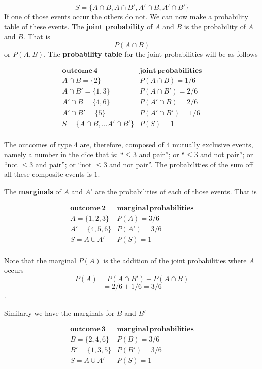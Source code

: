 \documentclass[
]{book}
\begin{document}
\[S=\{A\cap B, A \cap B', A'\cap B, A'\cap B'\}\]
If one of those events occur the others do not. We can now make a probability table of these events. The \textbf{joint probability} of \(A\) and \(B\) is the probability of \(A\) and \(B\). That is \[P( A \cap B)\] or \(P(A,B)\). The \textbf{probability table} for the joint probabilities will be as follows

\[
\begin{array}{ll}
\mathbf{outcome\, 4}  & \mathbf{joint\,probabilities} \\
 A\cap B=\{2\}    & P(A\cap B)=1/6 \\
 A\cap B'=\{1,3\} & P(A\cap B')=2/6 \\
 A'\cap B=\{4,6\} & P(A'\cap B)=2/6 \\
 A'\cap B'=\{5\}  & P(A'\cap B')=1/6 \\ \hline
S=\{A\cap B, ... A'\cap B'\} & P(S)=1 \\ 
\end{array}
\]

The outcomes of type 4 are, therefore, composed of 4 mutually exclusive events, namely a number in the dice that is: ``\(\leq 3\) and pair''; or ``\(\leq 3\) and not pair''; or ``not \(\leq 3\) and pair''; or ``not \(\leq 3\) and not pair''. The probabilities of the sum off all these composite events is \(1\).

The \textbf{marginals} of \(A\) and \(A'\) are the probabilities of each of those events. That is

\[
\begin{array}{ll}
\mathbf{outcome\, 2}  & \mathbf{marginal\,probabilities} \\
 A=\{1,2,3\}    & P(A)=3/6 \\
 A'=\{4,5,6\} & P(A')=3/6 \\ \hline
S=A\cup A' & P(S)=1 \\ 
\end{array}
\]

Note that the marginal \(P(A)\) is the addition of the joint probabilities where \(A\) occurs \[P(A)=P(A\cap B') + P(A \cap B)\] \[=2/6+1/6=3/6\] .

Similarly we have the marginals for \(B\) and \(B'\)

\[
\begin{array}{ll}
\mathbf{outcome\, 3}  & \mathbf{marginal\,probabilities} \\
 B=\{2,4,6\}    & P(B)=3/6 \\
 B'=\{1,3,5\} & P(B')=3/6 \\ \hline
S=A\cup A' & P(S)=1 \\ 
\end{array}
\]
\end{document}
